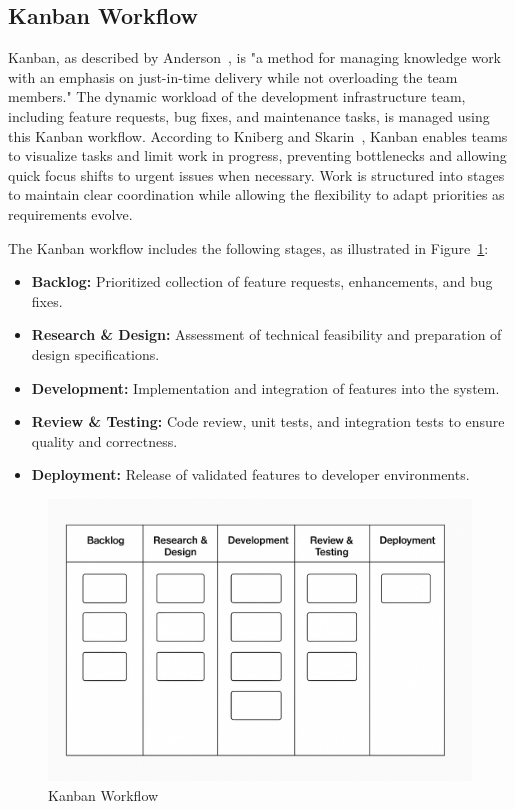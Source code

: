 \begin{spacing}{1.2}
\subsection{Kanban Workflow}
Kanban, as described by Anderson~\cite{anderson2010kanban}, is "a method for managing knowledge work with an emphasis on just-in-time delivery while not overloading the team members." The dynamic workload of the development infrastructure team, including feature requests, bug fixes, and maintenance tasks, is managed using this Kanban workflow. According to Kniberg and Skarin~\cite{kniberg2011kanban}, Kanban enables teams to visualize tasks and limit work in progress, preventing bottlenecks and allowing quick focus shifts to urgent issues when necessary. Work is structured into stages to maintain clear coordination while allowing the flexibility to adapt priorities as requirements evolve.  

The Kanban workflow includes the following stages, as illustrated in Figure~\ref{fig:kanban_workflow}:

\begin{itemize}
    \item \textbf{Backlog:} Prioritized collection of feature requests, enhancements, and bug fixes.
    \item \textbf{Research \& Design:} Assessment of technical feasibility and preparation of design specifications.
    \item \textbf{Development:} Implementation and integration of features into the system.
    \item \textbf{Review \& Testing:} Code review, unit tests, and integration tests to ensure quality and correctness.
    \item \textbf{Deployment:} Release of validated features to developer environments.
\end{itemize}

\begin{figure}[H]
    \centering
    \includegraphics[scale=0.2]{Images/kanban.png}
    \caption{Kanban Workflow}
    \label{fig:kanban_workflow}
\end{figure}



\end{spacing}
